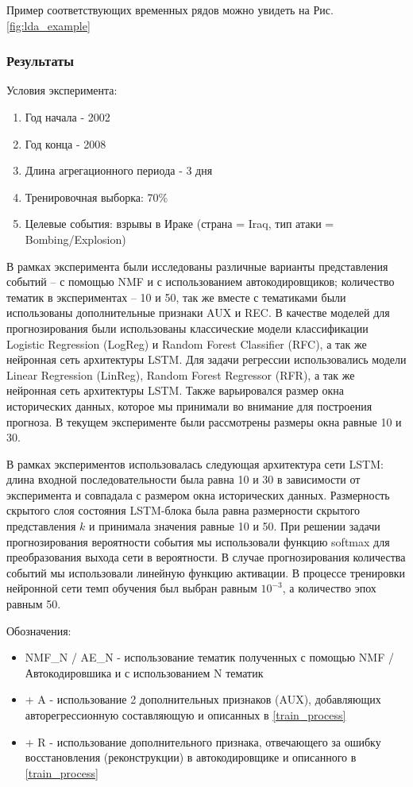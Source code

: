 Пример соответствующих временных рядов можно увидеть на Рис. \ref{fig:lda_example}

\subsubsection{Результаты}
Условия эксперимента:
\begin{enumerate}
    \item Год начала - 2002
    \item Год конца - 2008
    \item Длина агрегационного периода - 3 дня
    \item Тренировочная выборка: 70\%
    \item Целевые события: взрывы в Ираке (страна = Iraq, тип атаки = Bombing/Explosion)
\end{enumerate}
В рамках эксперимента были исследованы различные варианты представления событий -- с помощью NMF и с использованием автокодировщиков; количество тематик в экспериментах -- 10 и 50, так же вместе с тематиками были использованы дополнительные признаки AUX и REC.
В качестве моделей для прогнозирования были использованы классические модели классификации Logistic Regression (LogReg) и Random Forest Classifier (RFC), а так же нейронная сеть архитектуры LSTM.
Для задачи регрессии использовались модели Linear Regression (LinReg), Random Forest Regressor (RFR), а так же нейронная сеть архитектуры LSTM. Также варьировался размер окна исторических данных, которое мы принимали во внимание для построения прогноза. В текущем эксперименте были рассмотрены размеры окна равные 10 и 30.

В рамках экспериментов использовалась следующая архитектура сети LSTM: длина входной последовательности была равна 10 и 30 в зависимости от эксперимента и совпадала с размером окна исторических данных. Размерность скрытого слоя состояния LSTM-блока была равна размерности скрытого представления $k$ и принимала значения равные 10 и 50. При решении задачи прогнозирования вероятности события мы использовали функцию softmax для преобразования выхода сети в вероятности. В случае прогнозирования количества событий мы использовали линейную функцию активации. В процессе тренировки нейронной сети темп обучения был выбран равным $10^{-3}$, а количество эпох равным 50.

Обозначения:
\begin{itemize}
    \item  NMF\_N / AE\_N - использование тематик полученных с помощью NMF / Автокодировшика и с использованием N тематик
    \item + A - использование 2 дополнительных признаков (AUX), добавляющих авторегрессионную составляющую и описанных в \ref{train_process}
    \item + R - использование дополнительного признака, отвечающего за ошибку восстановления (реконструкции) в автокодировщике и описанного в \ref{train_process}
\end{itemize}

